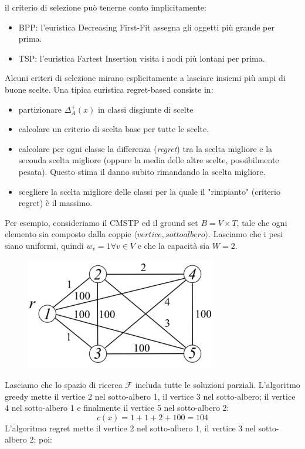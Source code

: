\documentclass{article}
\begin{document}
    il criterio di selezione può tenerne conto implicitamente:
    \begin{itemize}
        \item BPP: l'euristica Decreasing First-Fit assegna gli oggetti più grande per prima.
        \item TSP: l'euristica Fartest Insertion visita i nodi più lontani per prima.
    \end{itemize}
    Alcuni criteri di selezione mirano esplicitamente a lasciare insiemi più ampi di
    buone scelte. Una tipica euristica regret-based consiste in:
    \begin{itemize}
        \item partizionare $\Delta_A^+(x)$ in classi disgiunte di scelte
        \item calcolare un criterio di scelta base per tutte le scelte.
        \item calcolare per ogni classe la differenza (\textit{regret}) tra la scelta migliore
              e la seconda scelta migliore (oppure la media delle altre scelte, possibilmente pesata).
              Questo stima il danno subito rimandando la scelta migliore.
        \item scegliere la scelta migliore delle classi per la quale il "rimpianto" (criterio regret) è
              il massimo.
    \end{itemize}
    Per esempio, consideriamo il CMSTP ed il ground set $B=V\times T$, tale che ogni elemento sia composto
    dalla coppie $\langle vertice, sottoalbero \rangle$. Lasciamo che i pesi siano uniformi, quindi
$w_v=1 \forall v\in V$ e che la capacità sia $W=2$.

    \begin{figure}[H]
        \centering
        \includegraphics[scale=0.7]{images/CMSTP_0.png}
    \end{figure}
    Lasciamo che lo spazio di ricerca $\mathcal{F}$ includa tutte le soluzioni parziali. L'algoritmo
    greedy mette il vertice 2 nel sotto-albero 1, il vertice 3 nel sotto-albero; il vertice 4 nel sotto-albero
    1 e finalmente il vertice 5 nel sotto-albero 2:
    $$c(x)=1+1+2+100=104$$
    L'algoritmo regret mette il vertice 2 nel sotto-albero 1, il vertice 3 nel sotto-albero 2; poi:
\end{document}
